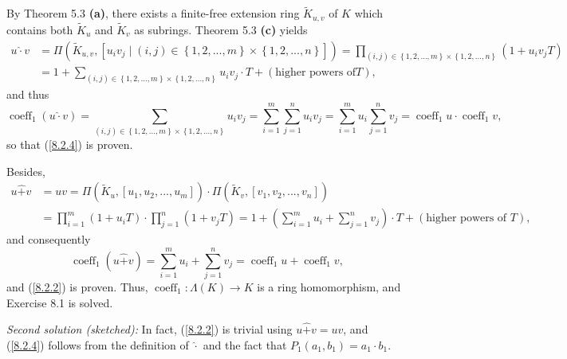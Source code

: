 \documentclass[numbers=enddot,12pt,final,onecolumn,notitlepage]{scrartcl}%
\begin{document}
By Theorem 5.3 \textbf{(a)}, there exists a finite-free extension ring
$\widetilde{K}_{u,v}$ of $K$ which contains both $\widetilde{K}_{u}$ and
$\widetilde{K}_{v}$ as subrings. Theorem 5.3 \textbf{(c)} yields%
\begin{align*}
u\widehat{\cdot}v  &  =\Pi\left(  \widetilde{K}_{u,v},\left[  u_{i}v_{j}%
\mid\left(  i,j\right)  \in\left\{  1,2,...,m\right\}  \times\left\{
1,2,...,n\right\}  \right]  \right)  =\prod_{\left(  i,j\right)  \in\left\{
1,2,...,m\right\}  \times\left\{  1,2,...,n\right\}  }\left(  1+u_{i}%
v_{j}T\right) \\
&  =1+\sum_{\left(  i,j\right)  \in\left\{  1,2,...,m\right\}  \times\left\{
1,2,...,n\right\}  }u_{i}v_{j}\cdot T+\left(  \text{higher powers of
}T\right)  ,
\end{align*}
and thus%
\[
\operatorname*{coeff}\nolimits_{1}\left(  u\widehat{\cdot}v\right)
=\sum_{\left(  i,j\right)  \in\left\{  1,2,...,m\right\}  \times\left\{
1,2,...,n\right\}  }u_{i}v_{j}=\sum_{i=1}^{m}\sum_{j=1}^{n}u_{i}v_{j}%
=\sum_{i=1}^{m}u_{i}\sum_{j=1}^{n}v_{j}=\operatorname*{coeff}\nolimits_{1}%
u\cdot\operatorname*{coeff}\nolimits_{1}v,
\]
so that (\ref{8.2.4}) is proven.

Besides,%
\begin{align*}
u\widehat{+}v  &  =uv=\Pi\left(  \widetilde{K}_{u},\left[  u_{1}%
,u_{2},...,u_{m}\right]  \right)  \cdot\Pi\left(  \widetilde{K}_{v},\left[
v_{1},v_{2},...,v_{n}\right]  \right) \\
&  =\prod_{i=1}^{m}\left(  1+u_{i}T\right)  \cdot\prod_{j=1}^{n}\left(
1+v_{j}T\right)  =1+\left(  \sum_{i=1}^{m}u_{i}+\sum_{j=1}^{n}v_{j}\right)
\cdot T+\left(  \text{higher powers of }T\right)  ,
\end{align*}
and consequently%
\[
\operatorname*{coeff}\nolimits_{1}\left(  u\widehat{+}v\right)  =\sum
_{i=1}^{m}u_{i}+\sum_{j=1}^{n}v_{j}=\operatorname*{coeff}\nolimits_{1}%
u+\operatorname*{coeff}\nolimits_{1}v,
\]
and (\ref{8.2.2}) is proven. Thus, $\operatorname*{coeff}\nolimits_{1}%
:\Lambda\left(  K\right)  \rightarrow K$ is a ring homomorphism, and Exercise
8.1 is solved.

\textit{Second solution (sketched):} In fact, (\ref{8.2.2}) is trivial using
$u\widehat{+}v=uv$, and (\ref{8.2.4}) follows from the definition of
$\widehat{\cdot}$ and the fact that $P_{1}\left(  a_{1},b_{1}\right)
=a_{1}\cdot b_{1}$.
\end{document}
